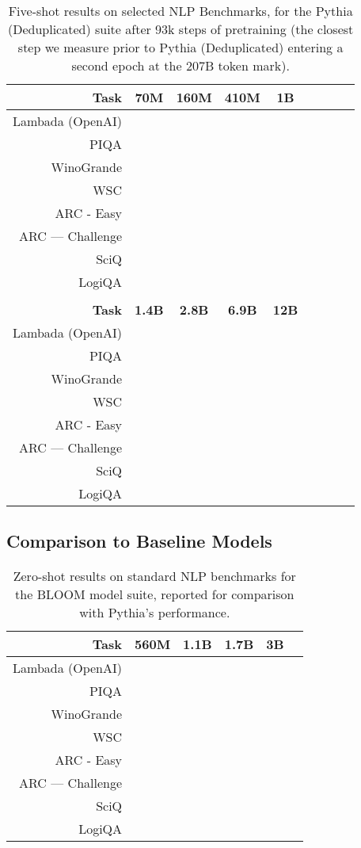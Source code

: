 \documentclass{article}
\theoremstyle{plain}
\theoremstyle{definition}
\theoremstyle{remark}
\begin{document}
\begin{table}[H]
\centering
\begin{tabular}{rcccccccc}
\toprule
\textbf{Task} & \textbf{70M} & \textbf{160M} & \textbf{410M} & \textbf{1B} \\
\midrule
Lambada (OpenAI) &  &  &  &  \\
PIQA &  &  &  & \\
WinoGrande &  &  &  &  \\
WSC &  &  &  &  \\
ARC - Easy &  &  &  &  \\
ARC — Challenge &  &  &  &  \\
SciQ &  &  &  &  \\
LogiQA &  &  &  &  \\
\bottomrule
\\
\textbf{Task} & \textbf{1.4B} & \textbf{2.8B} & \textbf{6.9B} & \textbf{12B} \\
\midrule
Lambada (OpenAI) &  &  &  &  \\
PIQA &  &  &  &  \\
WinoGrande &  &  &  &  \\
WSC &  &  &  &  \\
ARC - Easy &  &  &  &  \\
ARC — Challenge &  &  &  &  \\
SciQ &  &  &  &  \\
LogiQA &  &  &  &  \\
\bottomrule
\end{tabular}
\caption{Five-shot results on selected NLP Benchmarks, for the Pythia (Deduplicated) suite after 93k steps of pretraining (the closest step we measure prior to Pythia (Deduplicated) entering a second epoch at the 207B token mark).}
\end{table}

\subsection{Comparison to Baseline Models}\label{app:baseline-evals}
\begin{table}[H]
\centering
\begin{tabular}{rccccc}
\toprule
\textbf{Task} & \textbf{560M} & \textbf{1.1B} & \textbf{1.7B} & \textbf{3B} \\
\midrule
Lambada (OpenAI) &  &  &  &  \\
PIQA &  &  &  &  \\
WinoGrande &  &  &  &  \\
WSC &  &  &  &  \\
ARC - Easy &  &  &  &  \\
ARC — Challenge &  &  &  &  \\
SciQ &  &  &  &  \\
LogiQA &  &  &  &  \\
\bottomrule
\end{tabular}
\caption{Zero-shot results on standard NLP benchmarks for the BLOOM model suite, reported for comparison with Pythia's performance.}
\end{table}
\end{document}
